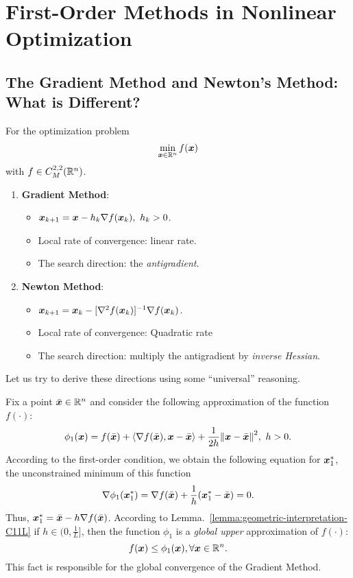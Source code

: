 \section{First-Order Methods in Nonlinear Optimization}\label{sect:1st-order-methods-in-nonlinear-opt}
\subsection{The Gradient Method and Newton's Method: What is Different?}\label{subsect: grad-newton-diff}

For the optimization problem
\[
    \min_{\bm{x} \in \mathbb{R}^n} f(\bm{x})  
\]
with \(f \in C_{M}^{2, 2}(\mathbb{R}^n)\).
\begin{enumerate}
    \item \textbf{Gradient Method}: 
        \begin{itemize}
            \item \(\bm{x}_{k+1} = \bm{x} - h_k \nabla f(\bm{x}_k),~h_k > 0\).
            \item Local rate of convergence: linear rate.
            \item The search direction: the \emph{antigradient}.
        \end{itemize}
    \item \textbf{Newton Method}: 
        \begin{itemize}
            \item \(\xB_{k+1} = \xB_k - [\hess f(\xB_k)]^{-1} \grad f(\xB_k)\).
            \item Local rate of convergence: Quadratic rate
            \item The search direction: multiply the antigradient by \emph{inverse Hessian}.
        \end{itemize}
\end{enumerate}
Let us try to derive these directions using some “universal” reasoning.

Fix a point \(\bar{\bm{x}} \in \mathbb{R}^n\) and consider the following approximation of the function \(f(\cdot)\):
\[
    \phi_1(\bm{x}) = f(\bar{\bm{x}}) + \left\langle \nabla f(\bar{\bm{x}}), \bm{x} - \bar{\bm{x}} \right\rangle + \frac{1}{2h} \norm{\bm{x} - \bar{\bm{x}}}^2, ~h > 0.  
\]
According to the first-order condition, we obtain the following equation for \(\bm{x}^*_1\), the unconstrained minimum of this function
\[
    \nabla \phi_1(\bm{x}^*_1) = \nabla f(\bar{\bm{x}}) + \frac{1}{h} (\bm{x}_1^* - \bar{\bm{x}}) = 0.  
\]
Thus, \(\bm{x}^*_1 = \bar{\bm{x}} - h\nabla f(\bar{\bm{x}})\). According to Lemma.~\ref{lemma:geometric-interpretation-C11L} if \(h \in (0, \frac{1}{L}]\), then the function \(\phi_1\) is a \emph{global upper}
approximation of \(f(\cdot)\):
\[
    f(\bm{x}) \le \phi_1(\bm{x}), \forall \bm{x} \in \mathbb{R}^n.  
\]
This fact is responsible for the global convergence of the Gradient Method.

